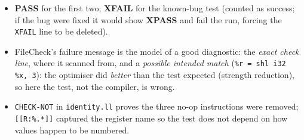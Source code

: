 \documentclass[10pt,a4paper,openany,oneside]{report}
\begin{document}
\begin{exbox}
\begin{itemize}[nosep]
\item \textbf{PASS} for the first two; \textbf{XFAIL} for the known-bug test (counted as success; if the bug were fixed it would show \textbf{XPASS} and fail the run, forcing the \texttt{XFAIL} line to be deleted).
\item FileCheck's failure message is the model of a good diagnostic: the \emph{exact check line}, where it scanned from, and a \emph{possible intended match} (\texttt{\%r = shl i32 \%x, 3}): the optimiser did \emph{better} than the test expected (strength reduction), so here the test, not the compiler, is wrong.
\item \texttt{CHECK-NOT} in \texttt{identity.ll} proves the three no-op instructions were removed; \texttt{[[R:\%.*]]} captured the register name so the test does not depend on how values happen to be numbered.
\end{itemize}
\end{exbox}
\end{document}

